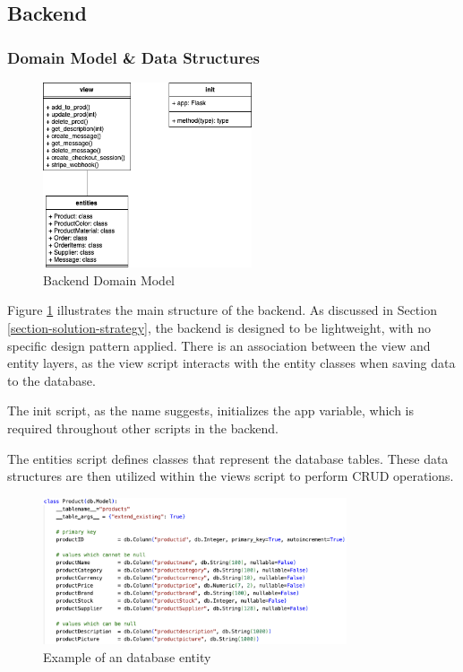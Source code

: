 \subsection{Backend}
\subsubsection{Domain Model \& Data Structures}

\begin{figure}
    \centering
    \includegraphics[width=0.55\textwidth]{images/uml_backend.png}
    \caption{Backend Domain Model}
    \label{fig:doman-model-backend}
\end{figure}

Figure \ref{fig:doman-model-backend} illustrates the main structure of the backend. As discussed in Section \ref{section-solution-strategy}, the backend is designed to be lightweight, with no specific design pattern applied. There is an association between the view and entity layers, as the view script interacts with the entity classes when saving data to the database.

The init script, as the name suggests, initializes the app variable, which is required throughout other scripts in the backend.

The entities script defines classes that represent the database tables. These data structures are then utilized within the views script to perform CRUD operations.

\begin{figure}[h]
    \centering
    \includegraphics[width=0.8\textwidth]{images/code_entity_example.png}
    \caption{Example of an database entity}
    \label{fig:db-entity}
\end{figure}


